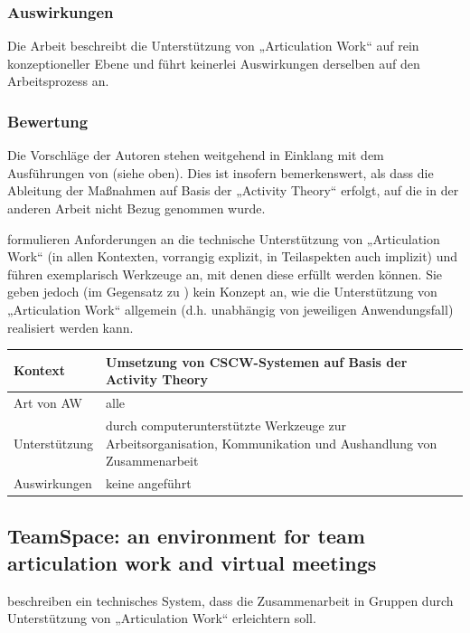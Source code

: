 \subsubsection{Auswirkungen}

Die Arbeit beschreibt die Unterstützung von „Articulation Work“ auf rein konzeptioneller Ebene und führt keinerlei Auswirkungen derselben auf den Arbeitsprozess an.

\subsubsection{Bewertung}

Die Vorschläge der Autoren stehen weitgehend in Einklang mit dem Ausführungen von \citet{Schmidt96} (siehe oben). Dies ist insofern bemerkenswert, als dass die Ableitung der Maßnahmen auf Basis der „Activity Theory“ erfolgt, auf die in der anderen Arbeit nicht Bezug genommen wurde.

\citeauthor{Fjuk97} formulieren Anforderungen an die technische Unterstützung von „Articulation Work“ (in allen Kontexten, vorrangig explizit, in Teilaspekten auch implizit) und führen exemplarisch Werkzeuge an, mit denen diese erfüllt werden können. Sie geben jedoch (im Gegensatz zu \citet{Schmidt96}) kein Konzept an, wie die Unterstützung von „Articulation Work“ allgemein (d.h. unabhängig von jeweiligen Anwendungsfall) realisiert werden kann.
\\[1em]
\begin{tabular}{| p{3cm} | p{10cm} |}
  \hline
  Kontext & Umsetzung von \gls{CSCW}-Systemen auf Basis der Activity Theory \\ \hline
  Art von AW & alle \\ \hline
  Unterstützung & durch computerunterstützte Werkzeuge zur Arbeitsorganisation, Kommunikation und Aushandlung von Zusammenarbeit\\ \hline
  Auswirkungen & keine angeführt \\ \hline
\end{tabular}

\subsection{TeamSpace: an environment for team articulation work and virtual meetings}
\label{sub:teamspace}

\citet{Fuchs01} beschreiben ein technisches System, dass die Zusammenarbeit in Gruppen durch Unterstützung von „Articulation Work“ erleichtern soll.

